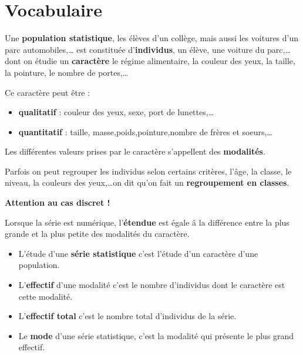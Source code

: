 \section{Vocabulaire}

\begin{definition}
Une \textbf{population statistique}, les élèves d'un collège, mais aussi les voitures d'un parc automobiles,\dots 
est constituée d'\textbf{individus}, un élève, une voiture du parc,\dots dont on étudie un \textbf{caractère} 
le régime alimentaire, la couleur des yeux, la taille, la pointure, le nombre de portes,\dots

\smallskip
Ce caractère peut être :
\begin{itemize}
\item \textbf{qualitatif} : couleur des yeux, sexe, port de lunettes,\dots
\item \textbf{quantitatif} : taille, masse,poids,pointure,nombre de frères et soeurs,\dots
\end{itemize}

Les différentes valeurs prises par le caractère s'appellent des \textbf{modalités}.

Parfois on peut regrouper les individus selon certains critères, l'âge, la classe, le niveau, la couleurs des yeux,\dots on dit qu'on fait un \textbf{regroupement en classes}.

\textbf{Attention au cas discret !}

\smallskip
Lorsque la série est numérique, l'\textbf{étendue} est égale â la différence entre la plus grande et la plus petite des modalités du caractère.
\begin{itemize}
\item L'étude d'une \textbf{série statistique} c'est l'étude d'un caractère d'une population.
\item L'\textbf{effectif} d'une modalité c'est le nombre d'individus dont le caractère est cette modalité.
\item L'\textbf{effectif total} c'est le nombre total d'individus de la série.
\item Le \textbf{mode} d'une série statistique, c'est la modalité qui présente le plus grand effectif.
\end{itemize}
\end{definition}